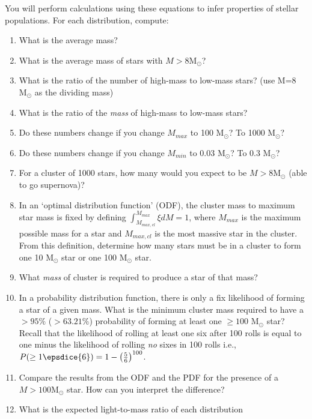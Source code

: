 \documentclass[twoside]{tufte-book} %
\newcommand{\msun}{\ensuremath{\mathrm{M}_\odot}\xspace}
\begin{document}
\begin{enumerate}
    You will perform calculations using these equations to infer properties of stellar
    populations.  For each distribution, compute:
    \begin{enumerate}
        \item What is the average mass?
        \item What is the average mass of stars with $M>8\msun$?
        \item What is the ratio of the number of high-mass to low-mass stars?
            (use M=8 \msun as the dividing mass)
        \item What is the ratio of the \emph{mass} of high-mass to low-mass stars?
        \item Do these numbers change if you change $M_{max}$ to 100 \msun?  To 1000 \msun?
        \item Do these numbers change if you change $M_{min}$ to 0.03 \msun?  To 0.3 \msun?
        \item For a cluster of 1000 stars, how many would you expect to be
            $M>8\msun$ (able to go supernova)?
        \item In an `optimal distribution function' (ODF), the cluster mass to maximum star mass
            is fixed by defining $\int_{M_{max,cl}}^{M_{max}} \xi dM = 1$,
            where $M_{max}$ is the maximum possible mass for a star and $M_{max,cl}$ is
            the most massive star in the cluster.
            From this definition, determine how many stars must be in a cluster
            to form one 10 \msun star or one 100 \msun star.
        \item What \emph{mass} of cluster is required to produce a star of that mass?
        \item In a probability distribution function, there is only a fix likelihood
            of forming a star of a given mass.  What is the minimum cluster mass
            required to have a $>95\%$ ($>63.21\%$) probability of forming at least one $\geq100$
            \msun star?\\
            Recall that the likelihood of rolling at least one six after 100 rolls
            is equal to one minus the likelihood of rolling \emph{no} sixes in 100 rolls
            i.e., $P(\ge 1 \epsdice{6}) = 1- \left(\frac{5}{6}\right)^{100}$.
        \item Compare the results from the ODF and the PDF for the presence of
            a $M>100\msun$ star.  How can you interpret the difference?
        \item What is the expected light-to-mass ratio of each distribution

\end{enumerate}
\end{enumerate}
\end{document}
